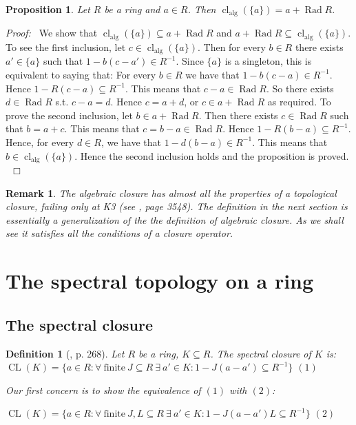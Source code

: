 \documentclass[12pt, oneside]{book}
\newtheorem{proposition}[theorem]{Proposition}
\newtheorem{definition}[theorem]{Definition}
\newtheorem{remark}[theorem]{Remark}
\newcommand{\proof}{{\noindent \it Proof:~}}
\newcommand{\qed}{\hfill ~$\Box$\\}
\def\Rad{\operatorname{Rad}}
\def\cl{\operatorname{cl}}
\def\CL{\operatorname{CL}}
\def\alg{\operatorname{alg}}
\begin{document}
\begin{proposition}\label{AlgClosureAndRad}
\normalfont
\noindent Let $R$ be a ring and $a \in R$. Then $\cl_{\alg}(\{a\}) = a + \Rad R.$
\end{proposition}
\proof
We show that $\cl_{\alg}(\{a\}) \subseteq a + \Rad R$ and $a + \Rad R \subseteq \cl_{\alg}(\{a\})$.
\vskip 0.3cm
\noindent To see the first inclusion, let $c \in \cl_{\alg}(\{a\})$. Then for every $b \in R$ there exists
$a' \in \{a \}$ such that $1 - b(c - a') \in R^{-1}$. Since $\{a\}$ is a singleton, this is equivalent to 
saying that: For every $b \in R$ we have that $1 - b(c - a) \in R^{-1}$. 
Hence $1 - R(c - a) \subseteq R^{-1}$. 
This means that $c - a \in \Rad R$. So there exists $d \in \Rad R$ s.t. $c - a = d$. 
Hence $c = a + d$, or $c \in a + \Rad R$ as required.
\vskip 0.3cm
\noindent To prove the second inclusion, let $b \in a + \Rad R$. Then there exists $c \in \Rad R$ 
such that $b = a + c$. This means that $c = b - a \in \Rad R$. Hence $1 - R(b - a) \subseteq R^{-1}$. 
Hence, for every $d \in R$, we have that $1 - d(b - a) \in R^{-1}$. 
This means that $b \in \cl_{\alg}(\{a\})$. Hence the second inclusion holds and the proposition is proved.
\qed

\begin{remark}
\normalfont
The algebraic closure has almost all the properties of a topological closure, failing only at 
K3 (see \cite{CH2}, page 3548). 
The definition in the next section is essentially a generalization of the the definition of
algebraic closure. As we shall see it satisfies all the conditions of a closure operator.

\end{remark}

\section{The spectral topology on a ring}

\subsection{The spectral closure}

\begin{definition}[\cite{CH3}, p. 268] 
\normalfont Let $R$ be a ring, $K \subseteq R$. The {\sl spectral closure} of $K$ is:
\vskip 0.3cm
\noindent $\CL(K)=\{ a \in R:  \forall\ \text{finite}\ J \subseteq R\  \exists\ a' \in K:  1-J(a-a') \subseteq R^{-1}\}$ \hfill $(1)$ 

\vskip 0.3cm

\noindent Our first concern is to show the equivalence of $(1)$ with $(2)$:

\vskip 0.3cm

\noindent $\CL(K)=\{ a \in R:  \forall\ \text{finite}\ J,L \subseteq R\ \exists\ a' \in K:  1-J(a-a')L \subseteq R^{-1}\}$ \hfill $(2)$ 

\end{definition}
\end{document}
